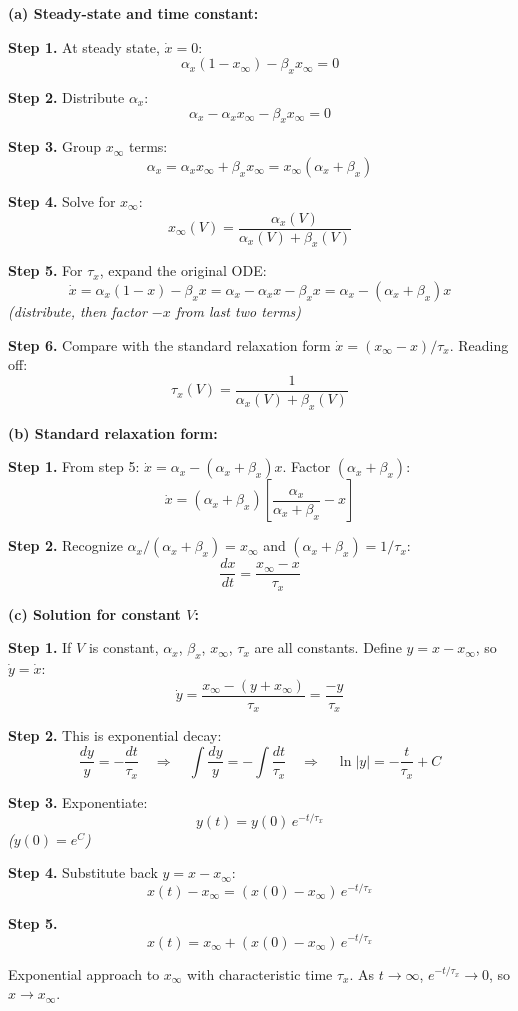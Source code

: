 \documentclass[10pt]{article}
\newcommand{\thus}{\quad\Longrightarrow\quad}
\newcommand{\stepwhy}[1]{\textcolor{blue!60!black}{\small\textit{(#1)}}}
\begin{document}
\begin{solution}
\textbf{(a) Steady-state and time constant:}

\textbf{Step 1.} At steady state, $\dot x = 0$:
\[
\alpha_x(1-x_\infty) - \beta_x x_\infty = 0
\]

\textbf{Step 2.} Distribute $\alpha_x$:
\[
\alpha_x - \alpha_x x_\infty - \beta_x x_\infty = 0
\]

\textbf{Step 3.} Group $x_\infty$ terms:
\[
\alpha_x = \alpha_x x_\infty + \beta_x x_\infty = x_\infty(\alpha_x + \beta_x)
\]

\textbf{Step 4.} Solve for $x_\infty$:
\[
\boxed{x_\infty(V) = \frac{\alpha_x(V)}{\alpha_x(V) + \beta_x(V)}}
\]

\textbf{Step 5.} For $\tau_x$, expand the original ODE:
\[
\dot x = \alpha_x(1-x) - \beta_x x = \alpha_x - \alpha_x x - \beta_x x = \alpha_x - (\alpha_x + \beta_x) x
\]
\stepwhy{distribute, then factor $-x$ from last two terms}

\textbf{Step 6.} Compare with the standard relaxation form $\dot x = (x_\infty - x)/\tau_x$. Reading off:
\[
\boxed{\tau_x(V) = \frac{1}{\alpha_x(V) + \beta_x(V)}}
\]

\medskip\textbf{(b) Standard relaxation form:}

\textbf{Step 1.} From step 5: $\dot x = \alpha_x - (\alpha_x + \beta_x)x$. Factor $(\alpha_x + \beta_x)$:
\[
\dot x = (\alpha_x + \beta_x)\left[\frac{\alpha_x}{\alpha_x + \beta_x} - x\right]
\]

\textbf{Step 2.} Recognize $\alpha_x/(\alpha_x + \beta_x) = x_\infty$ and $(\alpha_x + \beta_x) = 1/\tau_x$:
\[
\boxed{\frac{dx}{dt} = \frac{x_\infty - x}{\tau_x}}
\]

\medskip\textbf{(c) Solution for constant $V$:}

\textbf{Step 1.} If $V$ is constant, $\alpha_x$, $\beta_x$, $x_\infty$, $\tau_x$ are all constants. Define $y = x - x_\infty$, so $\dot y = \dot x$:
\[
\dot y = \frac{x_\infty - (y + x_\infty)}{\tau_x} = \frac{-y}{\tau_x}
\]

\textbf{Step 2.} This is exponential decay:
\[
\frac{dy}{y} = -\frac{dt}{\tau_x} \thus \int\frac{dy}{y} = -\int\frac{dt}{\tau_x} \thus \ln|y| = -\frac{t}{\tau_x} + C
\]

\textbf{Step 3.} Exponentiate:
\[
y(t) = y(0)\,e^{-t/\tau_x}
\]
\stepwhy{$y(0) = e^C$}

\textbf{Step 4.} Substitute back $y = x - x_\infty$:
\[
x(t) - x_\infty = (x(0) - x_\infty)\,e^{-t/\tau_x}
\]

\textbf{Step 5.}
\[
\boxed{x(t) = x_\infty + (x(0) - x_\infty)\,e^{-t/\tau_x}}
\]

Exponential approach to $x_\infty$ with characteristic time $\tau_x$. As $t \to \infty$, $e^{-t/\tau_x} \to 0$, so $x \to x_\infty$. \checkmark
\end{solution}
\end{document}
